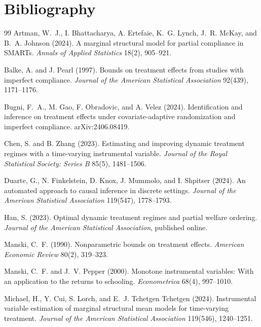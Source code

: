 \documentclass[11pt]{article}
\theoremstyle{definition}
\theoremstyle{plain}
\theoremstyle{remark}
\begin{document}
\section*{Bibliography}
\begin{thebibliography}{99}
Artman, W.~J., I. Bhattacharya, A. Ertefaie, K.~G. Lynch, J.~R. McKay, and B.~A. Johnson (2024).
\newblock A marginal structural model for partial compliance in SMARTs.
\newblock \emph{Annals of Applied Statistics} 18(2), 905--921.

Balke, A. and J. Pearl (1997).
\newblock Bounds on treatment effects from studies with imperfect compliance.
\newblock \emph{Journal of the American Statistical Association} 92(439), 1171--1176.

Bugni, F.~A., M. Gao, F. Obradovic, and A. Velez (2024).
\newblock Identification and inference on treatment effects under covariate-adaptive randomization and imperfect compliance.
\newblock arXiv:2406.08419.

Chen, S. and B. Zhang (2023).
\newblock Estimating and improving dynamic treatment regimes with a time-varying instrumental variable.
\newblock \emph{Journal of the Royal Statistical Society: Series B} 85(5), 1481--1506.

Duarte, G., N. Finkelstein, D. Knox, J. Mummolo, and I. Shpitser (2024).
\newblock An automated approach to causal inference in discrete settings.
\newblock \emph{Journal of the American Statistical Association} 119(547), 1778--1793.

Han, S. (2023).
\newblock Optimal dynamic treatment regimes and partial welfare ordering.
\newblock \emph{Journal of the American Statistical Association}, published online.

Manski, C.~F. (1990).
\newblock Nonparametric bounds on treatment effects.
\newblock \emph{American Economic Review} 80(2), 319--323.

Manski, C.~F. and J.~V. Pepper (2000).
\newblock Monotone instrumental variables: With an application to the returns to schooling.
\newblock \emph{Econometrica} 68(4), 997--1010.

Michael, H., Y. Cui, S. Lorch, and E.~J. Tchetgen Tchetgen (2024).
\newblock Instrumental variable estimation of marginal structural mean models for time-varying treatment.
\newblock \emph{Journal of the American Statistical Association} 119(546), 1240--1251.


\end{thebibliography}
\end{document}
